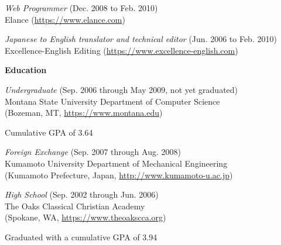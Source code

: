 \documentclass[10pt, a4paper]{article}
\begin{document}
\begin{itemize*}
\begin{itemize*}
    \end{itemize*}
  \item \emph{Web Programmer} (Dec. 2008 to Feb. 2010)\\
    Elance (\url{https://www.elance.com})
  \item \emph{Japanese to English translator and technical editor} (Jun. 2006 to Feb. 2010)\\
    Excellence-English Editing (\url{https://www.excellence-english.com})
\end{itemize*}
\textbf{Education}
\begin{itemize*}
  \item \emph{Undergraduate} (Sep. 2006 through May 2009, not yet graduated)\\
    Montana State University Department of Computer Science\\
    (Bozeman, MT, \url{https://www.montana.edu})
    \begin{itemize*}
      \item Cumulative GPA of 3.64
    \end{itemize*}
  \item \emph{Foreign Exchange} (Sep. 2007 through Aug. 2008)\\
    Kumamoto University Department of Mechanical Engineering\\
    (Kumamoto Prefecture, Japan, \url{http://www.kumamoto-u.ac.jp})
  \item \emph{High School} (Sep. 2002 through Jun. 2006)\\
    The Oaks Classical Christian Academy\\
    (Spokane, WA, \url{https://www.theoakscca.org})
    \begin{itemize*}
      \item Graduated with a cumulative GPA of 3.94
    \end{itemize*}
\end{itemize*}
\end{document}
